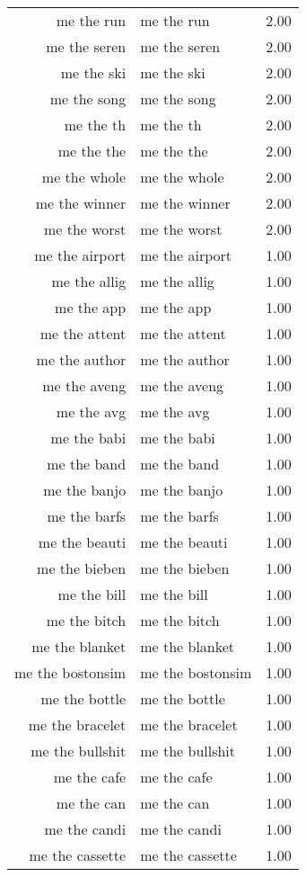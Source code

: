 \begin{table}[ht]
\begin{tabular}{rlr}
  me the run & me the run & 2.00 \\ 
  me the seren & me the seren & 2.00 \\ 
  me the ski & me the ski & 2.00 \\ 
  me the song & me the song & 2.00 \\ 
  me the th & me the th & 2.00 \\ 
  me the the & me the the & 2.00 \\ 
  me the whole & me the whole & 2.00 \\ 
  me the winner & me the winner & 2.00 \\ 
  me the worst & me the worst & 2.00 \\ 
  me the airport & me the airport & 1.00 \\ 
  me the allig & me the allig & 1.00 \\ 
  me the app & me the app & 1.00 \\ 
  me the attent & me the attent & 1.00 \\ 
  me the author & me the author & 1.00 \\ 
  me the aveng & me the aveng & 1.00 \\ 
  me the avg & me the avg & 1.00 \\ 
  me the babi & me the babi & 1.00 \\ 
  me the band & me the band & 1.00 \\ 
  me the banjo & me the banjo & 1.00 \\ 
  me the barfs & me the barfs & 1.00 \\ 
  me the beauti & me the beauti & 1.00 \\ 
  me the bieben & me the bieben & 1.00 \\ 
  me the bill & me the bill & 1.00 \\ 
  me the bitch & me the bitch & 1.00 \\ 
  me the blanket & me the blanket & 1.00 \\ 
  me the bostonsim & me the bostonsim & 1.00 \\ 
  me the bottle & me the bottle & 1.00 \\ 
  me the bracelet & me the bracelet & 1.00 \\ 
  me the bullshit & me the bullshit & 1.00 \\ 
  me the cafe & me the cafe & 1.00 \\ 
  me the can & me the can & 1.00 \\ 
  me the candi & me the candi & 1.00 \\ 
  me the cassette & me the cassette & 1.00 \\ 

\end{tabular}
\end{table}
